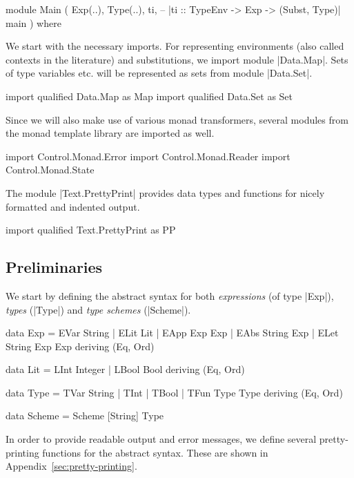 \documentclass[a4paper,11pt]{article}
\begin{document}
\begin{code}
module Main ( Exp(..),
              Type(..),
              ti,  -- |ti :: TypeEnv -> Exp -> (Subst, Type)|
              main
            ) where

\end{code}

We start with the necessary imports.  For representing environments
(also called contexts in the literature) and substitutions, we import
module |Data.Map|.  Sets of type variables etc. will be represented as
sets from module |Data.Set|.

\begin{code}
import qualified Data.Map as Map
import qualified Data.Set as Set
\end{code}

Since we will also make use of various monad transformers, several
modules from the monad template library are imported as well.
\begin{code}
import Control.Monad.Error
import Control.Monad.Reader
import Control.Monad.State
\end{code}

The module |Text.PrettyPrint| provides data types and functions for
nicely formatted and indented output.
\begin{code}
import qualified Text.PrettyPrint as PP
\end{code}


\subsection{Preliminaries}

We start by defining the abstract syntax for both \emph{expressions}
(of type |Exp|), \emph{types} (|Type|) and \emph{type schemes}
(|Scheme|).

\begin{code}
data Exp     =  EVar String
             |  ELit Lit
             |  EApp Exp Exp
             |  EAbs String Exp
             |  ELet String Exp Exp
             deriving (Eq, Ord)

data Lit     =  LInt Integer
             |  LBool Bool
             deriving (Eq, Ord)

data Type    =  TVar String
             |  TInt
             |  TBool
             |  TFun Type Type
             deriving (Eq, Ord)

data Scheme  =  Scheme [String] Type
\end{code}
%
In order to provide readable output and error messages, we define
several pretty-printing functions for the abstract syntax.  These are
shown in Appendix~\ref{sec:pretty-printing}.
\end{document}
